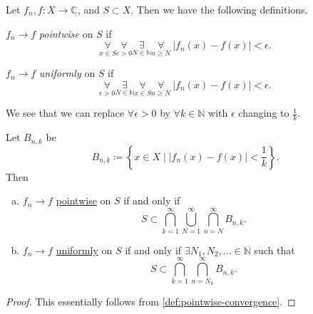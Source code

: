 \begin{definition*}
	Let \(f_{n}, f\colon X\to \mathbb{C}\), and \(S\subset X\). Then we have the following definitions.
	\begin{definition}\label{def:pointwise-convergence}
		\(f_{n}\to f\) \emph{pointwise} on \(S\) if
		\[
			\underset{x\in S}{\forall}\underset{\epsilon>0}{\forall} \underset{ N\in \mathbb{N}}{\exists}\underset{n\geq  N}{\forall}\ \left\vert f_{n}(x) - f(x) \right\vert < \epsilon.
		\]
	\end{definition}
	\begin{definition}\label{def:uniformly-convergence}
		\(f_{n}\to f\) \emph{uniformly} on \(S\) if
		\[
			\underset{\epsilon >0}{\forall}\underset{N\in\mathbb{N}}{\exists}\underset{x\in S}{\forall}\underset{n\geq N}{\forall}\ \left\vert f_{n}(x) - f(x) \right\vert < \epsilon.
		\]
	\end{definition}
\end{definition*}

\begin{remark}
	We see that we can replace \(\forall \epsilon > 0\) by \(\forall k\in \mathbb{N} \) with \(\epsilon \) changing to \(\frac{1}{k}\).
\end{remark}
\begin{lemma}
	Let \(B_{n, k}\) be
	\[
		B_{n, k}\coloneqq \left\{x\in X \mid \left\vert f_{n}(x) - f(x) \right\vert < \frac{1}{k}\right\}.
	\]
	Then
	\begin{enumerate}[(a)]
		\item \(f_{n}\to f\) \hyperref[def:pointwise-convergence]{pointwise} on \(S\) if and only if
		      \[
			      S\subset \bigcap_{k=1}^{\infty} \bigcup_{N=1}^{\infty} \bigcap_{n=N}^{\infty} B_{n, k}.
		      \]
		\item \(f_{n}\to f\) \hyperref[def:uniformly-convergence]{uniformly} on \(S\) if and only if \(\exists N_1, N_2, \dots \in \mathbb{N}\) such that
		      \[
			      S\subset \bigcap_{k=1}^{\infty} \bigcap_{n=N_{k}}^{\infty} B_{n, k}.
		      \]
	\end{enumerate}
\end{lemma}
\begin{proof}
	This essentially follows from \autoref{def:pointwise-convergence}.
\end{proof}

